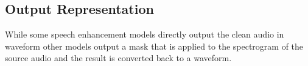 \subsection{Output Representation}
While some speech enhancement models directly output the clean audio in waveform other models output a mask that is applied to the spectrogram of the source audio and the result is converted back to a waveform.
